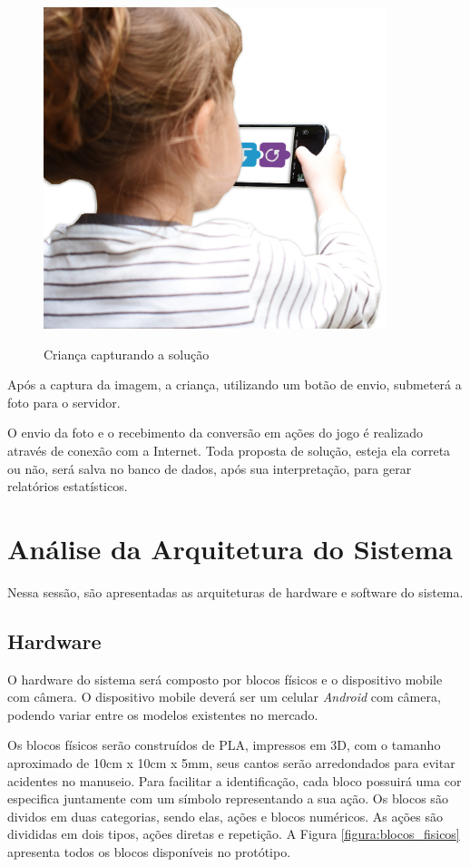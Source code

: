     \begin{figure}[H]
        \caption{Criança capturando a solução}
        \centering
        \includegraphics[width=10cm]{Imagens/Cap3/CriançaBlocos.jpg}
        \label{figura:crianca_blocos}
    \end{figure}
    
    Após a captura da imagem, a criança, utilizando um botão de envio, submeterá a foto para o servidor.
    
    O envio da foto e o recebimento da conversão em ações do jogo é realizado através de conexão com a Internet.
    Toda proposta de solução, esteja ela correta ou não, será salva no banco de dados, após sua interpretação, para gerar relatórios estatísticos.


\section{Análise da Arquitetura do Sistema}
    Nessa sessão, são apresentadas as arquiteturas de hardware e software do sistema.

    \subsection{Hardware}
    O hardware do sistema será composto por blocos físicos e o dispositivo mobile com câmera. O dispositivo mobile deverá ser um celular \textit{Android} com câmera, podendo variar entre os modelos existentes no mercado.
    
    Os blocos físicos serão construídos de PLA, impressos em 3D, com o tamanho aproximado de 10cm x 10cm x 5mm, seus cantos serão arredondados para evitar acidentes no manuseio. Para facilitar a identificação, cada bloco possuirá uma cor especifica juntamente com um símbolo representando a sua ação.
    Os blocos são dividos em duas categorias, sendo elas, ações e blocos numéricos. As ações são divididas em dois tipos, ações diretas e repetição. A Figura \ref{figura:blocos_fisicos} apresenta todos os blocos disponíveis no protótipo.
    
